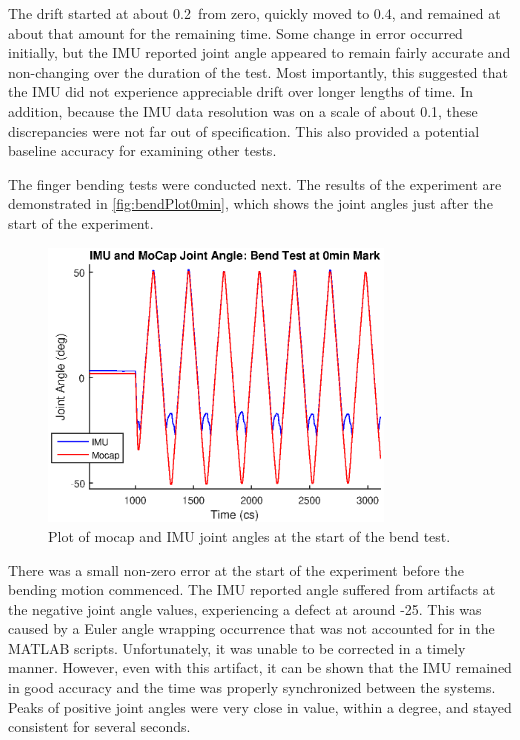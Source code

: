 \documentclass[letterpaper, 10 pt, conference]{ieeeconf}  %
\begin{document}
The drift started at about 0.2\degree\ from zero, quickly moved to 0.4\degree, and remained at about that amount for the remaining time. Some change in error occurred initially, but the IMU reported joint angle appeared to remain fairly accurate and non-changing over the duration of the test. Most importantly, this suggested that the IMU did not experience appreciable drift over longer lengths of time. In addition, because the IMU data resolution was on a scale of about 0.1\degree, these discrepancies were not far out of specification. This also provided a potential baseline accuracy for examining other tests. 

The finger bending tests were conducted next. The results of the experiment are demonstrated in \autoref{fig:bendPlot0min}, which shows the joint angles just after the start of the experiment.

\begin{figure}[thpb]
	\centering
	\includegraphics[width = 3.5in]{finger_bend_imuANDmocap_0min.eps}
    \caption{Plot of mocap and IMU joint angles at the start of the bend test.}
    \label{fig:bendPlot0min}
\end{figure}

There was a small non-zero error at the start of the experiment before the bending motion commenced. The IMU reported angle suffered from artifacts at the negative joint angle values, experiencing a defect at around -25\degree. This was caused by a Euler angle wrapping occurrence that was not accounted for in the MATLAB scripts. Unfortunately, it was unable to be corrected in a timely manner. However, even with this artifact, it can be shown that the IMU remained in good accuracy and the time was properly synchronized between the systems. Peaks of positive joint angles were very close in value, within a degree, and stayed consistent for several seconds. 
\end{document}
